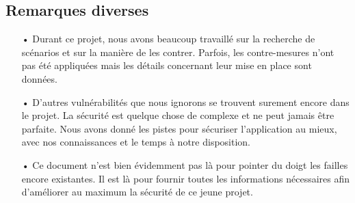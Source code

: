 \subsection*{Remarques diverses}

\begin{itemize}
\item[•] Durant ce projet, nous avons beaucoup travaillé sur la recherche de scénarios et sur la manière de les contrer. Parfois, les contre-mesures n'ont pas été appliquées mais les détails concernant leur mise en place sont données.
\item[•] D'autres vulnérabilités que nous ignorons se trouvent surement encore dans le projet. La sécurité est quelque chose de complexe et ne peut jamais être parfaite. Nous avons donné les pistes pour sécuriser l'application au mieux, avec nos connaissances et le temps à notre disposition.
\item[•] Ce document n'est bien évidemment pas là pour pointer du doigt les failles encore existantes. Il est là pour fournir toutes les informations nécessaires afin d'améliorer au maximum la sécurité de ce jeune projet. 
\end{itemize}
